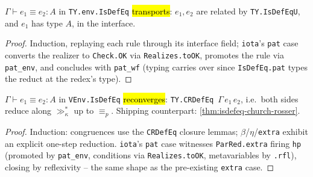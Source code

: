 \begin{lemma}
\label{thm:expb-todyping}
\leanok
{}

 $\Gamma\vdash e_1\equiv e_2:A$ in \texttt{TY.env.IsDefEq} \hl{transports}: $e_1,e_2$
are related by \texttt{TY.IsDefEqU}, and $e_1$ has type $A$, in the interface.
\end{lemma}
\begin{proof}
\leanok
{} Induction, replaying each rule through its interface field; \texttt{iota}'s \texttt{pat}
case converts the realizer to \texttt{Check.OK} via \texttt{Realizes.toOK}, promotes the rule via
\texttt{pat\_env}, and concludes with \texttt{pat\_wf} (typing carries over since
\texttt{IsDefEq.pat} types the reduct at the redex's type).
\end{proof}

\begin{theorem}
\label{thm:expb-isdefequ-church-rosser}
\leanok
{}

 $\Gamma\vdash e_1\equiv e_2:A$ in \texttt{VEnv.IsDefEq} \hl{reconverges}:
\texttt{TY.CRDefEq}~$\Gamma\,e_1\,e_2$, i.e.\ both sides reduce along $\gg_\kappa^{*}$ up to
$\equiv_p$. Shipping counterpart: \ref{thm:isdefeq-church-rosser}.
\end{theorem}
\begin{proof}
\leanok
{} Induction: congruences use the \texttt{CRDefEq} closure lemmas;
$\beta$/$\eta$/\texttt{extra} exhibit an explicit one-step reduction. \texttt{iota}'s \texttt{pat}
case witnesses \texttt{ParRed.extra} firing \texttt{hp} (promoted by \texttt{pat\_env}, conditions
via \texttt{Realizes.toOK}, metavariables by \texttt{.rfl}), closing by reflexivity -- the same
shape as the pre-existing \texttt{extra} case.
\end{proof}

